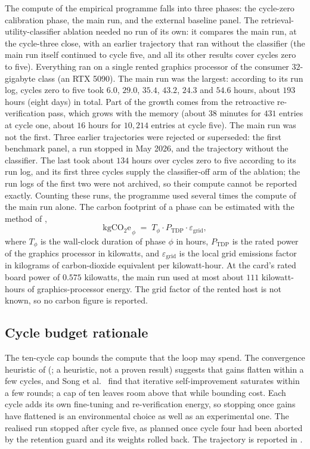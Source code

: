 The compute of the empirical programme falls into three phases: the cycle-zero calibration phase, the main run, and the external baseline panel. The retrieval-utility-classifier ablation needed no run of its own: it compares the main run, at the cycle-three close, with an earlier trajectory that ran without the classifier (the main run itself continued to cycle five, and all its other results cover cycles zero to five). Everything ran on a single rented graphics processor of the consumer $32$-gigabyte class (an RTX 5090). The main run was the largest: according to its run log, cycles zero to five took $6.0$, $29.0$, $35.4$, $43.2$, $24.3$ and $54.6$ hours, about $193$ hours (eight days) in total. Part of the growth comes from the retroactive re-verification pass, which grows with the memory (about $38$ minutes for $431$ entries at cycle one, about $16$ hours for $10{,}214$ entries at cycle five). The main run was not the first. Three earlier trajectories were rejected or superseded: the first benchmark panel, a run stopped in May 2026, and the trajectory without the classifier. The last took about $134$ hours over cycles zero to five according to its run log, and its first three cycles supply the classifier-off arm of the ablation; the run logs of the first two were not archived, so their compute cannot be reported exactly. Counting these runs, the programme used several times the compute of the main run alone. The carbon footprint of a phase can be estimated with the method of \textcite{strubell2019energy},
\begin{equation}
\mathrm{kgCO_{2}e}_{\,\phi} \;=\; T_{\phi} \cdot P_{\mathrm{TDP}} \cdot \varepsilon_{\mathrm{grid}},
\label{eq:carbon-per-phase}
\end{equation}
where $T_{\phi}$ is the wall-clock duration of phase $\phi$ in hours, $P_{\mathrm{TDP}}$ is the rated power of the graphics processor in kilowatts, and $\varepsilon_{\mathrm{grid}}$ is the local grid emissions factor in kilograms of carbon-dioxide equivalent per kilowatt-hour. At the card's rated board power of $0.575$ kilowatts, the main run used at most about $111$ kilowatt-hours of graphics-processor energy. The grid factor of the rented host is not known, so no carbon figure is reported.

\subsection{Cycle budget rationale}
\label{sec:env-cycles}

The ten-cycle cap bounds the compute that the loop may spend. The convergence heuristic of  (; a heuristic, not a proven result) suggests that gains flatten within a few cycles, and Song et al.~\cite{song2024gap} find that iterative self-improvement saturates within a few rounds; a cap of ten leaves room above that while bounding cost. Each cycle adds its own fine-tuning and re-verification energy, so stopping once gains have flattened is an environmental choice as well as an experimental one. The realised run stopped after cycle five, as planned once cycle four had been aborted by the retention guard and its weights rolled back. The trajectory is reported in .


